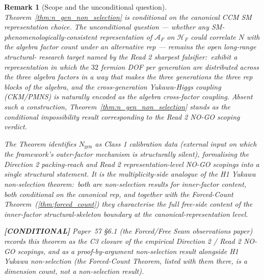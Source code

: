 \documentclass[11pt]{article}
\newtheorem{remark}{Remark}
\begin{document}
\begin{remark}[Scope and the unconditional question]
\label{rem:n_gen_scope}
Theorem~\ref{thm:n_gen_non_selection} is conditional on the canonical
CCM SM representation choice.  The unconditional question --- whether
any SM-phenomenologically-consistent representation of $\mathcal{A}_F$
on $\mathcal{H}_F$ could correlate $N$ with the algebra factor count
under an alternative rep --- remains the open long-range structural-
research target named by the Read 2 sharpest falsifier:\ exhibit a
representation in which the $32$ fermion DOF per generation are
distributed across the three algebra factors in a way that makes
the three generations the three rep blocks of the algebra, and the
cross-generation Yukawa-Higgs coupling (CKM/PMNS) is naturally
encoded as the algebra cross-factor coupling.  Absent such a
construction, Theorem~\ref{thm:n_gen_non_selection} stands as the
conditional impossibility result corresponding to the Read 2
NO-GO scoping verdict.

The Theorem identifies $N_{\mathrm{gen}}$ as Class 1 calibration data
(external input on which the framework's outer-factor mechanism is
structurally silent), formalising the Direction 2 packing-reach
and Read 2 representation-level NO-GO scopings into a single
structural statement.  It is the multiplicity-side analogue of the
H1 Yukawa non-selection theorem:\ both are non-selection results for
inner-factor content, both conditional on the canonical rep, and
together with the Forced-Count Theorem~(\ref{thm:forced_count}) they
characterise the full free-side content of the inner-factor
structural-skeleton boundary at the canonical-representation level.

\textbf{[CONDITIONAL]} Paper~57 \S 6.1 (the Forced/Free Seam observations paper) records
this theorem as the C3 closure of the empirical Direction 2 / Read 2
NO-GO scopings, and as a proof-by-argument non-selection result
alongside H1 Yukawa non-selection (the Forced-Count Theorem, listed
with them there, is a dimension count, not a non-selection result).
\end{remark}

\end{document}
